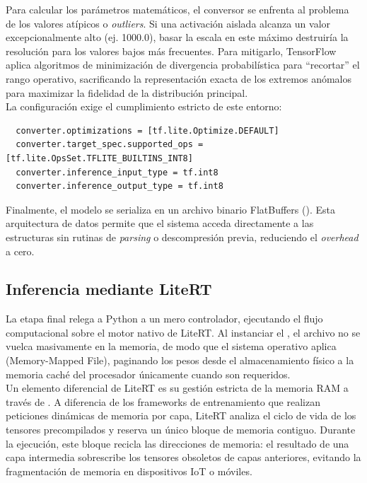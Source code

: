 \documentclass[a4paper,12pt,twoside,final]{book}
\begin{document}
Para calcular los parámetros matemáticos, el conversor se enfrenta al problema de los valores atípicos o
\textit{outliers}. Si una activación aislada alcanza un valor excepcionalmente alto (ej. 1000.0), basar la escala en
este máximo destruiría la resolución para los valores bajos más frecuentes. Para mitigarlo, TensorFlow aplica
algoritmos de minimización de divergencia probabilística para ``recortar'' el rango operativo, sacrificando la
representación exacta de los extremos anómalos para maximizar la fidelidad de la distribución principal.\\

La configuración exige el cumplimiento estricto de este entorno:
\begin{verbatim}
  converter.optimizations = [tf.lite.Optimize.DEFAULT]
  converter.target_spec.supported_ops = [tf.lite.OpsSet.TFLITE_BUILTINS_INT8]
  converter.inference_input_type = tf.int8
  converter.inference_output_type = tf.int8
\end{verbatim}

Finalmente, el modelo se serializa en un archivo binario FlatBuffers (). Esta arquitectura de datos
permite que el sistema acceda directamente a las estructuras sin rutinas de \textit{parsing} o descompresión previa,
reduciendo el \textit{overhead} a cero.

\subsection{Inferencia mediante LiteRT}
La etapa final relega a Python a un mero controlador, ejecutando el flujo computacional sobre el motor nativo de LiteRT.
Al instanciar el , el archivo  no se vuelca masivamente en la memoria, de modo que el
sistema operativo aplica  (Memory-Mapped File), paginando los pesos desde el almacenamiento físico a la
memoria caché del procesador únicamente cuando son requeridos.\\

Un elemento diferencial de LiteRT es su gestión estricta de la memoria RAM a través de
. A diferencia de los frameworks de entrenamiento que realizan peticiones dinámicas de memoria
por capa, LiteRT analiza el ciclo de vida de los tensores precompilados y reserva un único bloque de memoria contiguo.
Durante la ejecución, este bloque recicla las direcciones de memoria: el resultado de una capa intermedia sobrescribe
los tensores obsoletos de capas anteriores, evitando la fragmentación de memoria en dispositivos IoT o móviles.\\
\end{document}
